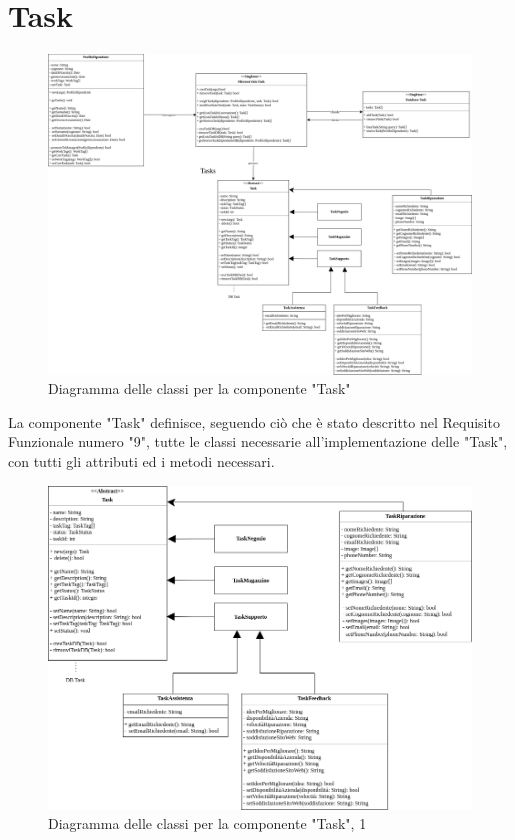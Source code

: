 \documentclass{report}
\begin{document}
\section{Task}

\begin{figure}[H]
	\centering\includegraphics[width=1\textwidth]{third-deliverable/images/Diagramma_delle_classi_task.png}
	Diagramma delle classi per la componente "Task"
\end{figure}
La componente "Task" definisce, seguendo ciò che è stato descritto nel Requisito Funzionale numero "9", tutte le classi necessarie all'implementazione delle "Task", con tutti gli attributi ed i metodi necessari.

\begin{figure}[H]
	\centering\includegraphics[width=1.2\textwidth]{third-deliverable/images/Diagramma_delle_classi_task1.png}
	Diagramma delle classi per la componente "Task", 1
\end{figure}
\end{document}
